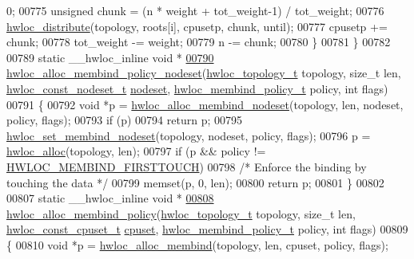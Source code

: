 \begin{DoxyCode}
      0;
00775     \textcolor{keywordtype}{unsigned} chunk = (n * weight + tot\_weight-1) / tot\_weight;
00776     \hyperlink{a00059_ga6d5c88292ad5aa062c1bebc99369c042}{hwloc_distribute}(topology, roots[i], cpusetp, chunk, until);
00777     cpusetp += chunk;
00778     tot\_weight -= weight;
00779     n -= chunk;
00780   \}
00781 \}
00782 
00789 \textcolor{keyword}{static} \_\_hwloc\_inline \textcolor{keywordtype}{void} *
\hypertarget{a00031_source_l00790}{}\hyperlink{a00059_ga3e772fbc4de626ed80f13d332b7d4d03}{00790} \hyperlink{a00059_ga3e772fbc4de626ed80f13d332b7d4d03}{hwloc_alloc_membind_policy_nodeset}(\hyperlink{a00039_ga9d1e76ee15a7dee158b786c30b6a6e38}{hwloc_topology_t} topology, \textcolor{keywordtype}{size\_t} len, 
      \hyperlink{a00040_ga2f5276235841ad66a79bedad16a5a10c}{hwloc_const_nodeset_t} \hyperlink{a00016_a08f0d0e16c619a6e653526cbee4ffea3}{nodeset}, \hyperlink{a00050_gac9764f79505775d06407b40f5e4661e8}{hwloc_membind_policy_t} policy, \textcolor{keywordtype}{int} flags)
00791 \{
00792   \textcolor{keywordtype}{void} *p = \hyperlink{a00050_gaeaa00714a9c4319bda0a74ca6f8720e8}{hwloc_alloc_membind_nodeset}(topology, len, nodeset, policy, flags);
00793   \textcolor{keywordflow}{if} (p)
00794     \textcolor{keywordflow}{return} p;
00795   \hyperlink{a00050_ga747962cbb16fd12ad6d126011c734a27}{hwloc_set_membind_nodeset}(topology, nodeset, policy, flags);
00796   p = \hyperlink{a00050_gac5586e58cf25c3596b7d4aa31ce13259}{hwloc_alloc}(topology, len);
00797   \textcolor{keywordflow}{if} (p && policy != \hyperlink{a00050_ggac9764f79505775d06407b40f5e4661e8a979c7aa78dd32780858f30f47a72cca0}{HWLOC_MEMBIND_FIRSTTOUCH})
00798     \textcolor{comment}{/* Enforce the binding by touching the data */}
00799     memset(p, 0, len);
00800   \textcolor{keywordflow}{return} p;
00801 \}
00802 
00807 \textcolor{keyword}{static} \_\_hwloc\_inline \textcolor{keywordtype}{void} *
\hypertarget{a00031_source_l00808}{}\hyperlink{a00059_ga6178c6a9ec1dd88ec9f6a9fcdcc7d634}{00808} \hyperlink{a00059_ga6178c6a9ec1dd88ec9f6a9fcdcc7d634}{hwloc_alloc_membind_policy}(\hyperlink{a00039_ga9d1e76ee15a7dee158b786c30b6a6e38}{hwloc_topology_t} topology, \textcolor{keywordtype}{size\_t} len, 
      \hyperlink{a00040_ga1f784433e9b606261f62d1134f6a3b25}{hwloc_const_cpuset_t} \hyperlink{a00016_a67925e0f2c47f50408fbdb9bddd0790f}{cpuset}, \hyperlink{a00050_gac9764f79505775d06407b40f5e4661e8}{hwloc_membind_policy_t} policy, \textcolor{keywordtype}{int} flags)
00809 \{
00810   \textcolor{keywordtype}{void} *p = \hyperlink{a00050_ga221a7edc5d436300374fa16463f607e5}{hwloc_alloc_membind}(topology, len, cpuset, policy, flags);

\end{DoxyCode}
